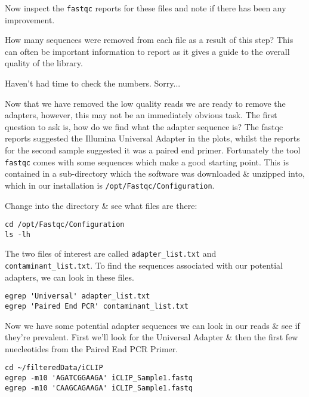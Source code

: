 Now inspect the \texttt{fastqc} reports for these files and note if there has been any improvement.
\begin{questions}
How many sequences were removed from each file as a result of this step?
This can often be important information to report as it gives a guide to the overall quality of the library. \\
\begin{answer}
Haven't had time to check the numbers. 
Sorry...
\end{answer}
\end{questions}

Now that we have removed the low quality reads we are ready to remove the adapters, however, this may not be an immediately obvious task.
The first question to ask is, how do we find what the adapter sequence is?
The fastqc reports suggested the Illumina Universal Adapter in the plots, whilst the reports for the second sample suggested it was a paired end primer.
Fortunately the tool \texttt{fastqc} comes with some sequences which make a good starting point.
This is contained in a sub-directory which the software was downloaded \& unzipped into, which in our installation is \texttt{/opt/Fastqc/Configuration}.

\begin{steps}
Change into the directory \& see what files are there:
\begin{lstlisting}
cd /opt/Fastqc/Configuration
ls -lh
\end{lstlisting}
\end{steps}

\begin{steps}
The two files of interest are called \texttt{adapter_list.txt} and \texttt{contaminant_list.txt}.
To find the sequences associated with our potential adapters, we can look in these files.
\begin{lstlisting}
egrep 'Universal' adapter_list.txt
egrep 'Paired End PCR' contaminant_list.txt
\end{lstlisting}
\end{steps}

\begin{steps}
Now we have some potential adapter sequences we can look in our reads \& see if they're prevalent.
First we'll look for the Universal Adapter \& then the first few nuecleotides from the Paired End PCR Primer.
\begin{lstlisting}
cd ~/filteredData/iCLIP
egrep -m10 'AGATCGGAAGA' iCLIP_Sample1.fastq
egrep -m10 'CAAGCAGAAGA' iCLIP_Sample1.fastq
\end{lstlisting}
\end{steps}

